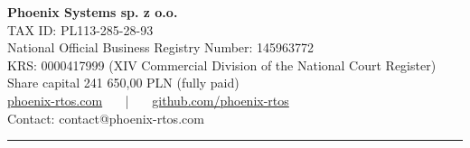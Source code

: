 {\setmainfont{Liberation Sans}
\begin{flushright}
    {\fontsize{24}{28}\selectfont \textbf{Phoenix Systems sp. z o.o.}\\}
    \vspace{1cm}
    {\fontsize{9}{15}\selectfont TAX ID: PL113-285-28-93\\
                       National Official Business Registry Number: 145963772\\
                       KRS: 0000417999 (XIV Commercial Division of the National Court Register)\\
                       Share capital 241 650,00 PLN (fully paid)\\}
    \vspace{0.8cm}
    \hypersetup{colorlinks=true, urlcolor=ps-orange}
    {\fontsize{10}{12}\selectfont
        \href{https://phoenix-rtos.com}{phoenix-rtos.com}
        ~~~|~~~
        \href{https://github.com/phoenix-rtos}{github.com/phoenix-rtos}\\
    }
    \vspace{0.3cm}
    {\fontsize{10}{12}\selectfont Contact: contact@phoenix-rtos.com}
\end{flushright}

\vspace{1.6cm}

\noindent
{}}

\vspace{\fill}

\begin{center}
    \color{ps-orange}\rule{\textwidth}{2pt}
\end{center}
